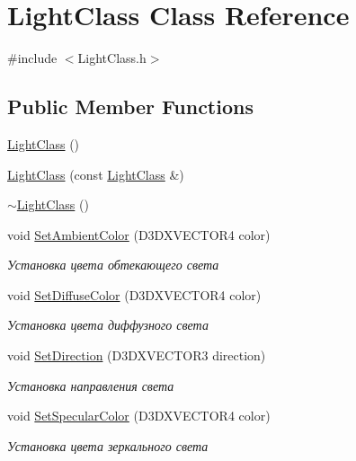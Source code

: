 \hypertarget{class_light_class}{}\section{Light\+Class Class Reference}
\label{class_light_class}


{\ttfamily \#include $<$Light\+Class.\+h$>$}

\subsection*{Public Member Functions}
\begin{DoxyCompactItemize}
\item 
\hyperlink{class_light_class_a2a2026c39b7ad9acae4c8402a3d2b1db}{Light\+Class} ()
\item 
\hyperlink{class_light_class_a93aecd8ad64e1e052f923cfb8cc4064a}{Light\+Class} (const \hyperlink{class_light_class}{Light\+Class} \&)
\item 
\hyperlink{class_light_class_a9eb4fd06c8b041279d5089580f6185e6}{$\sim$\+Light\+Class} ()
\item 
void \hyperlink{class_light_class_af5ca906d1c54205419a49ba2463b4153}{Set\+Ambient\+Color} (D3\+D\+X\+V\+E\+C\+T\+O\+R4 color)
\begin{DoxyCompactList}\small\item\em Установка цвета обтекающего света \end{DoxyCompactList}\item 
void \hyperlink{class_light_class_ab93e4fabdd76cfa2dd79bd76cdc1f115}{Set\+Diffuse\+Color} (D3\+D\+X\+V\+E\+C\+T\+O\+R4 color)
\begin{DoxyCompactList}\small\item\em Установка цвета диффузного света \end{DoxyCompactList}\item 
void \hyperlink{class_light_class_a4728e2e14ff7afc3fb48a1dd3a68c5f7}{Set\+Direction} (D3\+D\+X\+V\+E\+C\+T\+O\+R3 direction)
\begin{DoxyCompactList}\small\item\em Установка направления света \end{DoxyCompactList}\item 
void \hyperlink{class_light_class_ac35f54fb2dc8974281305207f1585b6e}{Set\+Specular\+Color} (D3\+D\+X\+V\+E\+C\+T\+O\+R4 color)
\begin{DoxyCompactList}\small\item\em Установка цвета зеркального света \end{DoxyCompactList}\item 

\end{DoxyCompactItemize}
